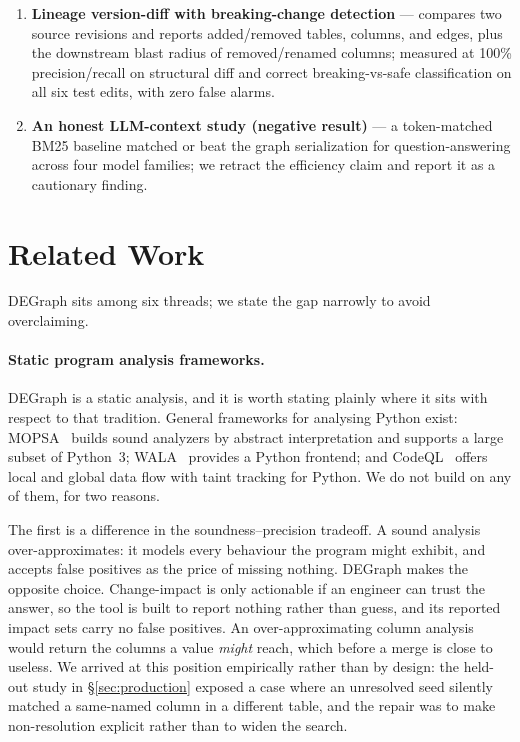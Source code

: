 \documentclass[11pt]{article}
\begin{document}
\begin{enumerate}
separating tool limitations from \emph{theoretic limits of execution-free analysis}
(a table name read from a runtime job parameter is resolvable by no static analyzer),
and a negative generalization result: 100\%/68\% on the development pipeline versus
0.167/0.118 on the held-out one. The held-out corpus also exposed a precision defect
that the development corpus structurally could not.
\item \textbf{Lineage version-diff with breaking-change detection} --- compares two
source revisions and reports added/removed tables, columns, and edges, plus the
downstream blast radius of removed/renamed columns; measured at 100\%
precision/recall on structural diff and correct breaking-vs-safe classification on
all six test edits, with zero false alarms.
\item \textbf{An honest LLM-context study (negative result)} --- a token-matched
BM25 baseline matched or beat the graph serialization for question-answering across
four model families; we retract the efficiency claim and report it as a cautionary
finding.
\end{enumerate}

\section{Related Work}
DEGraph sits among six threads; we state the gap narrowly to avoid overclaiming.

\paragraph{Static program analysis frameworks.} DEGraph is a static analysis, and it is
worth stating plainly where it sits with respect to that tradition. General frameworks for
analysing Python exist: MOPSA~\cite{mopsa} builds sound analyzers by abstract interpretation
and supports a large subset of Python~3; WALA~\cite{wala} provides a Python frontend; and
CodeQL~\cite{codeql} offers local and global data flow with taint tracking for Python. We do
not build on any of them, for two reasons.

The first is a difference in the soundness--precision tradeoff. A sound analysis
over-approximates: it models every behaviour the program might exhibit, and accepts false
positives as the price of missing nothing. DEGraph makes the opposite choice.
Change-impact is only actionable if an engineer can trust the answer, so the tool is built to
report nothing rather than guess, and its reported impact sets carry no false positives. An
over-approximating column analysis would return the columns a value \emph{might} reach, which
before a merge is close to useless. We arrived at this position empirically rather than by
design: the held-out study in \S\ref{sec:production} exposed a case where an unresolved seed
silently matched a same-named column in a different table, and the repair was to make
non-resolution explicit rather than to widen the search.
\end{document}
